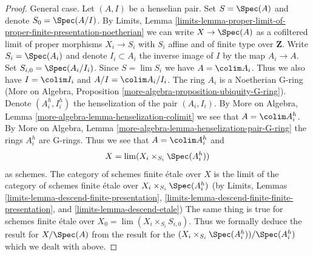 \begin{proof}
\medskip\noindent
General case. Let $(A, I)$ be a henselian pair.
Set $S = \Spec(A)$ and denote $S_0 = \Spec(A/I)$. By Limits, Lemma
\ref{limits-lemma-proper-limit-of-proper-finite-presentation-noetherian}
we can write $X \to \Spec(A)$ as a cofiltered limit of
proper morphisms $X_i \to S_i$ with $S_i$ affine and of finite type
over $\mathbf{Z}$. Write $S_i = \Spec(A_i)$ and denote
$I_i \subset A_i$ the inverse image of $I$ by the map $A_i \to A$.
Set $S_{i, 0} = \Spec(A_i/I_i)$. Since $S = \lim S_i$ we have
$A = \colim A_i$. Thus we also have $I = \colim I_i$ and $A/I = \colim A_i/I_i$.
The ring $A_i$ is a Noetherian G-ring (More on Algebra, Proposition
\ref{more-algebra-proposition-ubiquity-G-ring}).
Denote $(A_i^h, I_i^h)$ the henselization of the pair $(A_i, I_i)$.
By More on Algebra, Lemma \ref{more-algebra-lemma-henselization-colimit}
we see that $A = \colim A_i^h$. By
More on Algebra, Lemma \ref{more-algebra-lemma-henselization-pair-G-ring}
the rings $A_i^h$ are G-rings. Thus we see that $A = \colim A_i^h$ and
$$
X = \lim (X_i \times_{S_i} \Spec(A_i^h))
$$
as schemes. The category of schemes finite \'etale over $X$ is the limit
of the category of schemes finite \'etale over
$X_i \times_{S_i} \Spec(A_i^h)$ (by
Limits, Lemmas
\ref{limits-lemma-descend-finite-presentation},
\ref{limits-lemma-descend-finite-finite-presentation}, and
\ref{limits-lemma-descend-etale})
The same thing is true for schemes finite \'etale over
$X_0 = \lim (X_i \times_{S_i} S_{i, 0})$.
Thus we formally deduce the result for $X / \Spec(A)$
from the result for the $(X_i \times_{S_i} \Spec(A_i^h)) / \Spec(A_i^h)$
which we dealt with above.
\end{proof}
